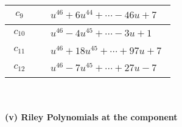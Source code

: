 \documentclass[1p]{elsarticle_modified}
\theoremstyle{definition}
\begin{document}
\begin{tabular}{m{50pt}|m{274pt}}
\hline $$\begin{aligned}c_{9}\end{aligned}$$&$\begin{aligned}
&u^{46}+6 u^{44}+\cdots-46 u+7
\end{aligned}$\\
\hline $$\begin{aligned}c_{10}\end{aligned}$$&$\begin{aligned}
&u^{46}-4 u^{45}+\cdots-3 u+1
\end{aligned}$\\
\hline $$\begin{aligned}c_{11}\end{aligned}$$&$\begin{aligned}
&u^{46}+18 u^{45}+\cdots+97 u+7
\end{aligned}$\\
\hline $$\begin{aligned}c_{12}\end{aligned}$$&$\begin{aligned}
&u^{46}-7 u^{45}+\cdots+27 u-7
\end{aligned}$\\
\hline
\end{tabular}\\~\\
\newpage\renewcommand{\arraystretch}{1}
\flushleft \textbf{(v) Riley Polynomials at the component}\newline \\
\end{document}

